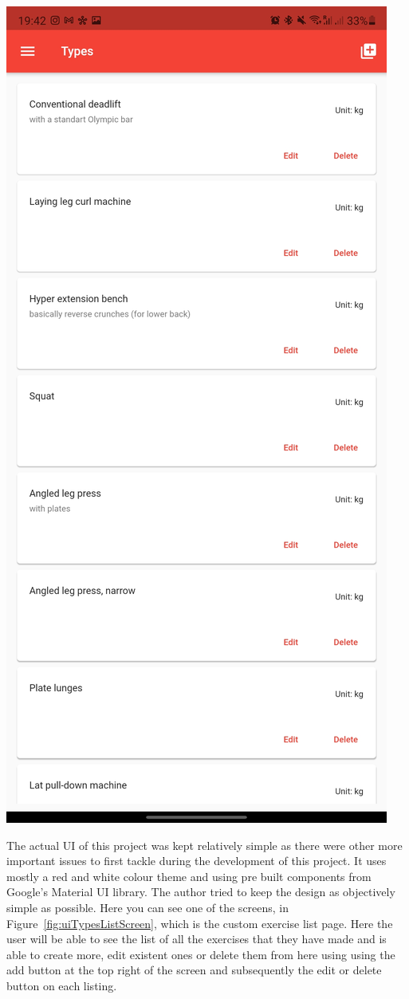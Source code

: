 \documentclass{article}
\begin{document}
\begin{multicols}{2}
\begingroup
\centering
\includegraphics[width=0.7\linewidth]{./appendix/assets/img/uiScreenShots/typesListScreen.jpg}
~\label{fig:uiTypesListScreen}
\endgroup

The actual UI of this project was kept relatively simple as there were other more important issues to first tackle during the development of this project. It uses mostly a red and white colour theme and using pre built components from Google's Material UI library\cite{materialUi}. The author tried to keep the design as objectively simple as possible. Here you can see one of the screens, in Figure~\ref{fig:uiTypesListScreen}, which is the custom exercise list page. Here the user will be able to see the list of all the exercises that they have made and is able to create more, edit existent ones or delete them from here using using the add button at the top right of the screen and subsequently the edit or delete button on each listing.


\end{multicols}
\end{document}
